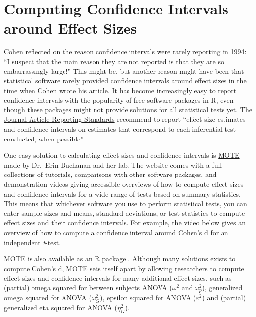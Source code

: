 \documentclass[
]{krantz}
\begin{document}
\hypertarget{computing-confidence-intervals-around-effect-sizes}{%
\section{Computing Confidence Intervals around Effect Sizes}\label{computing-confidence-intervals-around-effect-sizes}}

Cohen \citeyearpar{cohen_earth_1994} reflected on the reason confidence intervals were rarely reporting in 1994: ``I suspect that the main reason they are not reported is that they are so embarrassingly large!'' This might be, but another reason might have been that statistical software rarely provided confidence intervals around effect sizes in the time when Cohen wrote his article. It has become increasingly easy to report confidence intervals with the popularity of free software packages in R, even though these packages might not provide solutions for all statistical tests yet. The \href{https://apastyle.apa.org/jars/quantitative}{Journal Article Reporting Standards} recommend to report ``effect-size estimates and confidence intervals on estimates that correspond to each inferential test conducted, when possible''.

One easy solution to calculating effect sizes and confidence intervals is \href{https://www.aggieerin.com/shiny-server/}{MOTE} made by Dr.~Erin Buchanan and her lab. The website comes with a full collections of tutorials, comparisons with other software packages, and demonstration videos giving accessible overviews of how to compute effect sizes and confidence intervals for a wide range of tests based on summary statistics. This means that whichever software you use to perform statistical tests, you can enter sample sizes and means, standard deviations, or test statistics to compute effect sizes and their confidence intervals. For example, the video below gives an overview of how to compute a confidence interval around Cohen's d for an independent \emph{t}-test.

MOTE is also available as an R package \citep{buchanan_mote_2017}. Although many solutions exists to compute Cohen's d, MOTE sets itself apart by allowing researchers to compute effect sizes and confidence intervals for many additional effect sizes, such as (partial) omega squared for between subjects ANOVA (\(\omega^{2}\) and \(\omega^{2}_p\)), generalized omega squared for ANOVA (\(\omega^{2}_G\)), epsilon squared for ANOVA (\(\varepsilon^{2}\)) and (partial) generalized eta squared for ANOVA (\(\eta^{2}_G\)).
\end{document}

